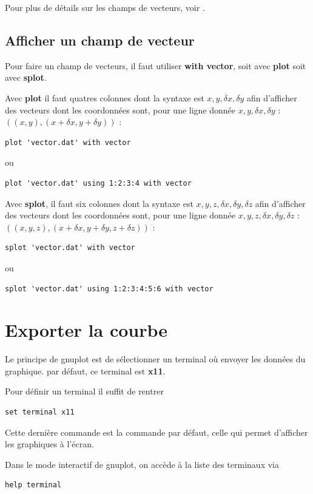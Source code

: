\documentclass[a4paper,twoside]{article}
\begin{document}
Pour plus de détails sur les champs de vecteurs, voir .

\subsection{Afficher un champ de vecteur}\label{sec:vector}
Pour faire un champ de vecteurs, il faut utiliser \textbf{with vector}, soit avec \textbf{plot} soit avec \textbf{splot}.

\bigskip

Avec \textbf{plot} il faut quatres colonnes dont la syntaxe est $x, y, \delta x, \delta y$ afin d'afficher des vecteurs dont les coordonnées sont, pour une ligne donnée $x, y, \delta x, \delta y$ : $((x,y), (x+\delta x, y+\delta y))$ :
\begin{verbatim}
plot 'vector.dat' with vector
\end{verbatim}
ou
\begin{verbatim}
plot 'vector.dat' using 1:2:3:4 with vector
\end{verbatim}

\bigskip

Avec \textbf{splot}, il faut six colonnes dont la syntaxe est $x, y, z, \delta x, \delta y, \delta z$ afin d'afficher des vecteurs dont les coordonnées sont, pour une ligne donnée $x, y, z, \delta x, \delta y, \delta z$ : $((x,y,z), (x+\delta x, y+\delta y, z+\delta z))$ :
\begin{verbatim}
splot 'vector.dat' with vector
\end{verbatim}
ou
\begin{verbatim}
splot 'vector.dat' using 1:2:3:4:5:6 with vector
\end{verbatim}



\section{Exporter la courbe}\label{sec:terminal}
Le principe de gnuplot est de sélectionner un terminal où envoyer les données du graphique. par défaut, ce terminal est \textbf{x11}. 

Pour définir un terminal il suffit de rentrer
\begin{verbatim}
set terminal x11
\end{verbatim}
Cette dernière commande est la commande par défaut, celle qui permet d'afficher les graphiques à l'écran.

Dans le mode interactif de gnuplot, on accède à la liste des terminaux via
\begin{verbatim}
help terminal
\end{verbatim}
\end{document}
